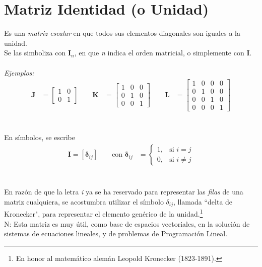 \documentclass[a4paper,12pt]{report} %
\begin{document}
\section{Matriz Identidad (o Unidad)}
Es una \textit{matriz escalar} en que todos sus elementos diagonales son iguales a la unidad.\\
Se las simboliza con \(\mathbf{I}_\mathit{n}\), en que \textit{n} indica el orden matricial, o simplemente con \textbf{I}. \\ \\
\textit{Ejemplos:} \\
\[
\begin{aligned}
\mathbf{J} &= \begin{bmatrix}
    1 & 0 \\
    0 & 1
\end{bmatrix}
\qquad
\mathbf{K} &= \begin{bmatrix}
    1  & 0 & 0 \\
    0 & 1 & 0 \\
    0 & 0 & 1
\end{bmatrix}
\qquad
\mathbf{L} &= \begin{bmatrix}
    1 & 0 & 0 & 0\\
    0 & 1 & 0 & 0\\
    0 & 0 & 1 & 0\\
    0 & 0 & 0 & 1
\end{bmatrix}
\end{aligned}
\]
\\ \\
En símbolos, se escribe
\[
\begin{aligned}
    \mathbf{I} = \left[\mathit{\mathbf{\delta}_{ij}}\right]
    \qquad
    \text{con } \mathbf{\delta}_{ij} &= \begin{cases}
        1, & \text{si } \mathit{i = j} \\
        0, & \text{si } \mathit{i\neq j}
    \end{cases}
\end{aligned}
\]
\\ \\
En razón de que la letra \textit{i} ya se ha reservado para representar las \textit{filas} de una matriz cualquiera, se acostumbra utilizar el símbolo \(\delta_{ij}\), llamada ``delta de Kronecker", para representar el elemento genérico de la unidad.\footnote{En honor al matemático alemán Leopold Kronecker (1823-1891).}\\
N\scalebox{0.8}{OTA}: Esta matriz es muy útil, como base de espacios vectoriales, en la solución de sistemas de ecuaciones lineales, y de problemas de Programación Lineal.
\\ 
\end{document}
